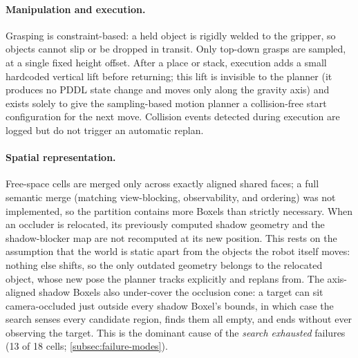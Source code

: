\paragraph{Manipulation and execution.} Grasping is constraint-based: a
held object is rigidly welded to the gripper, so objects cannot slip or be
dropped in transit. Only top-down grasps are sampled, at a single fixed
height offset. After a place or stack, execution adds a
small hardcoded vertical lift before returning; this lift is invisible to
the planner (it produces no PDDL state change and moves only along the
gravity axis) and exists solely to give the sampling-based motion
planner a collision-free start configuration for the next move. Collision
events detected during execution are logged but do not trigger an automatic
replan.

\paragraph{Spatial representation.} Free-space cells are merged only across
exactly aligned shared faces; a full semantic merge (matching
view-blocking, observability, and ordering) was not implemented, so the
partition contains more Boxels than strictly necessary. When an occluder is
relocated, its previously computed shadow geometry and the shadow-blocker
map are not recomputed at its new position. This rests on the assumption
that the world is static apart from the objects the robot itself moves:
nothing else shifts, so the only outdated geometry belongs to the relocated
object, whose new pose the planner tracks explicitly and replans from.
The axis-aligned shadow Boxels also under-cover the occlusion cone: a
target can sit camera-occluded just outside every shadow Boxel's bounds,
in which case the search senses every candidate region, finds them all
empty, and ends without ever observing the target. This is the dominant
cause of the \emph{search exhausted} failures (13 of 18 cells;
\cref{subsec:failure-modes}).


